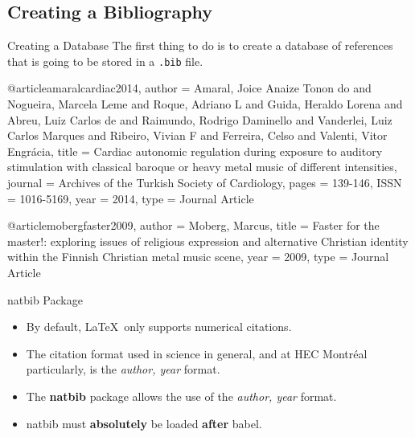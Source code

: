 \subsection{Creating a Bibliography}

\begin{frame}[fragile]{Creating a Database}
	The first thing to do is to create a database of references that is going to be stored in a \texttt{.bib} file.
	
\begin{codesource}
	
	@article{amaralcardiac2014,
		author = {Amaral, Joice Anaize Tonon do and Nogueira, Marcela Leme and Roque, Adriano L 
			and Guida, Heraldo Lorena and Abreu, Luiz Carlos de and Raimundo, Rodrigo Daminello 
			and Vanderlei, Luiz Carlos Marques and Ribeiro, Vivian F and Ferreira, Celso and 
			Valenti, Vitor Engrácia},
		title = {Cardiac autonomic regulation during exposure to auditory stimulation with classical
			baroque or heavy metal music of different intensities},
		journal = {Archives of the Turkish Society of Cardiology},
		pages = {139-146},
		ISSN = {1016-5169},
		year = {2014},
		type = {Journal Article}
	}
	
	@article{mobergfaster2009,
		author = {Moberg, Marcus},
		title = {Faster for the master!: exploring issues of religious expression and alternative
			Christian identity within the Finnish Christian metal music scene},
		year = {2009},
		type = {Journal Article}
	}
\end{codesource}
\end{frame}

\begin{frame}[fragile]{natbib Package}
	\begin{itemize}
		\item By default, \LaTeX\ only supports numerical citations.
		\item The citation format used in science in general, and at HEC Montréal particularly, is the \emph{author, year} format.
		\item The \textbf{natbib} package allows the use of the \emph{author, year} format.

		\pause
		
		\item natbib must \textbf{absolutely} be loaded \textbf{after} babel.
	\end{itemize}
\end{frame}

